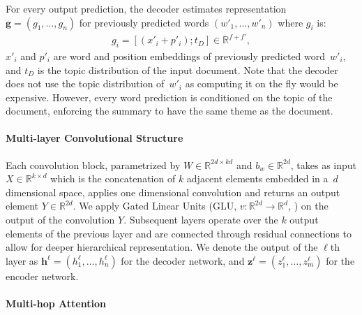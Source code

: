For every output prediction, the decoder estimates representation
$\mathbf{g} = (g_1, \ldots, g_n)$ for previously predicted words
$(w'_1, \ldots, w'_n)$ where $g_i$ is:
\begin{align}
g_i = [(x'_i+p'_i);t_D] \in \mathbb{R}^{f+f'}, \label{eq:decoder}
\end{align}
\noindent $x'_i$ and $p'_i$ are word and position embeddings of
previously predicted word~$w'_i$, and $t_D$ is the topic distribution
of the input document. Note that the decoder does not use the topic
distribution of~$w'_i$ as computing it on the fly would be
expensive. However, every word prediction is conditioned on the topic
of the document, enforcing the summary to have the same theme as the
document.


\paragraph{Multi-layer Convolutional Structure}

Each convolution block, parametrized by $W \in \mathbb{R}^{2d\times
  kd}$ and $b_w \in \mathbb{R}^{2d}$, takes as input $X \in
\mathbb{R}^{k\times d}$ which is the concatenation of $k$ adjacent
elements embedded in a~$d$ dimensional space, applies one dimensional
convolution and returns an output element $Y \in \mathbb{R}^{2d}$. We
apply Gated Linear Units (GLU, $v:\mathbb{R}^{2d} \rightarrow
\mathbb{R}^{d}$, \citeauthor{pmlr-v70-dauphin17a}
\citeyear{pmlr-v70-dauphin17a}) on the output of the convolution
$Y$. Subsequent layers operate over the $k$ output elements of the
previous layer and are connected through residual connections
\cite{He2016DeepRL} to allow for deeper hierarchical
representation. We denote the output of the $\ell$th layer as
$\mathbf{h^{\ell}} = (h^{\ell}_1, \ldots, h^{\ell}_n)$ for the decoder
network, and $\mathbf{z^{\ell}} = (z^{\ell}_1, \ldots, z^{\ell}_m)$
for the encoder network.

\paragraph{Multi-hop Attention}

